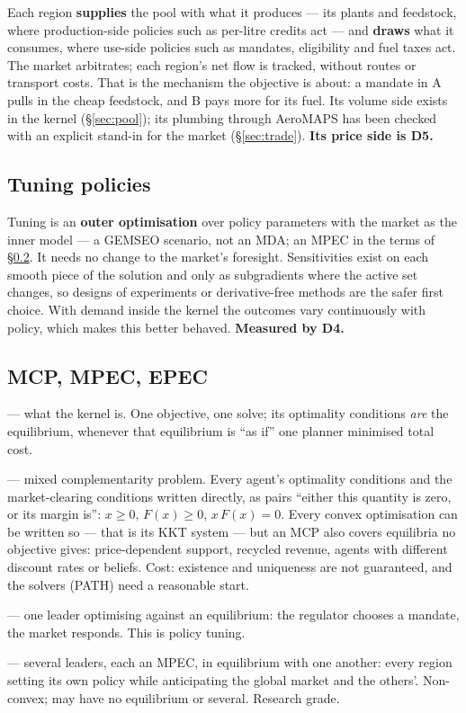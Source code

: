 \documentclass[11pt,a4paper]{article}
\begin{document}
Each region \textbf{supplies} the pool with what it produces --- its plants and feedstock, where
production-side policies such as per-litre credits act --- and \textbf{draws} what it consumes,
where use-side policies such as mandates, eligibility and fuel taxes act. The market arbitrates;
each region's net flow is tracked, without routes or transport costs. That is the mechanism the
objective is about: a mandate in A pulls in the cheap feedstock, and B pays more for its fuel.
Its volume side exists in the kernel (\S\ref{sec:pool}); its plumbing through AeroMAPS has been
checked with an explicit stand-in for the market (\S\ref{sec:trade}). \textbf{Its price side is
D5.}

\subsection{Tuning policies}

Tuning is an \textbf{outer optimisation} over policy parameters with the market as the inner
model --- a GEMSEO scenario, not an MDA; an MPEC in the terms of \S\ref{sec:mcp}. It needs no
change to the market's foresight. Sensitivities exist on each smooth piece of the solution and
only as subgradients where the active set changes, so designs of experiments or
derivative-free methods are the safer first choice. With demand inside the kernel the outcomes
vary continuously with policy, which makes this better behaved. \textbf{Measured by D4.}

\subsection{MCP, MPEC, EPEC}
\label{sec:mcp}

\begin{description}[leftmargin=0pt,itemsep=3pt]
  \item[Optimisation] --- what the kernel is. One objective, one solve; its optimality
    conditions \emph{are} the equilibrium, whenever that equilibrium is ``as if'' one planner
    minimised total cost.
  \item[MCP] --- mixed complementarity problem. Every agent's optimality conditions and the
    market-clearing conditions written directly, as pairs ``either this quantity is zero, or
    its margin is'': $x \ge 0$, $F(x) \ge 0$, $x\,F(x) = 0$. Every convex optimisation can be
    written so --- that is its KKT system --- but an MCP also covers equilibria no objective
    gives: price-dependent support, recycled revenue, agents with different discount rates or
    beliefs. Cost: existence and uniqueness are not guaranteed, and the solvers (PATH) need a
    reasonable start.
  \item[MPEC] --- one leader optimising against an equilibrium: the regulator chooses a
    mandate, the market responds. This is policy tuning.
  \item[EPEC] --- several leaders, each an MPEC, in equilibrium with one another: every region
    setting its own policy while anticipating the global market and the others'. Non-convex;
    may have no equilibrium or several. Research grade.
\end{description}
\end{document}
